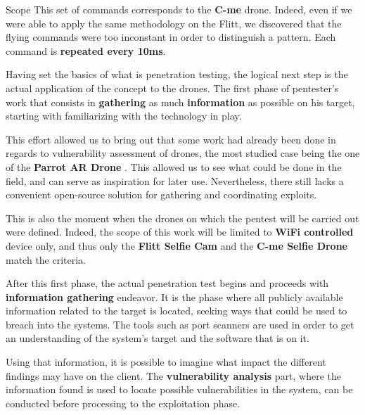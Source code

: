 \begin{chaptercover}{Scope}
This set of commands corresponds to the \textbf{C-me} drone. Indeed, even if we were able to apply the same methodology on the Flitt, we discovered that the flying commands were too inconstant in order to distinguish a pattern. Each command is \textbf{repeated every 10ms}.

\begin{summary}
Having set the basics of what is penetration testing, the logical next step is the actual application of the concept to the drones. The first phase of pentester's work that consists in \textbf{gathering} as much \textbf{information} as possible on his target, starting with familiarizing with the technology in play.

This effort allowed us to bring out that some work had already been done in regards to vulnerability assessment of drones, the most studied case being the one of the \textbf{Parrot AR Drone} \cite{github-drone-hacking} \cite{hacking-securing-ardrone2}. This allowed us to see what could be done in the field, and can serve as inspiration for later use. Nevertheless, there still lacks a convenient open-source solution for gathering and coordinating exploits.

This is also the moment when the drones on which the pentest will be carried out were defined. Indeed, the scope of this work will be limited to \textbf{WiFi controlled} device only, and thus only the \textbf{Flitt Selfie Cam} and the \textbf{C-me Selfie Drone} match the criteria.

After this first phase, the actual penetration test begins and proceeds with \textbf{information gathering} endeavor. It is the phase where all publicly available information related to the target is located, seeking ways that could be used to breach into the systems. The tools such as port scanners are used in order to get an understanding of the system's target and the software that is on it.

Using that information, it is possible to imagine what impact the different findings may have on the client. The \textbf{vulnerability analysis} part, where the information found is used to locate possible vulnerabilities in the system, can be conducted before processing to the exploitation phase.


\end{summary}
\end{chaptercover}
